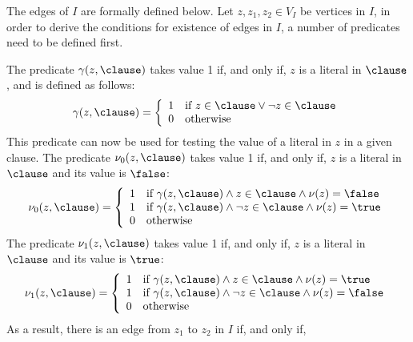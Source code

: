 The edges of $I$ are formally defined below. Let $z, z_1, z_2 \in V_I$ be
vertices in $I$, in order to derive the conditions for existence of edges in
$I$, a number of predicates need to be defined first. 

\begin{definition}
    The predicate $\gamma(z, \clause)$ takes value 1 if, and only if, $z$
    is a literal in $\clause$, and is defined as follows:
    \begin{equation}
        \gamma(z, \clause) = 
        \left\{
            \begin{array}{ll}
                1 & \text{if $z \in \clause \lor \neg z \in \clause$} \\
                0 & \text{otherwise}
            \end{array}
        \right.
    \end{equation}
    This predicate can now be used for testing the value of a literal in $z$ in
    a given clause. The predicate $\nu_0(z, \clause)$ takes value 1 if, and only
    if, $z$ is a literal in $\clause$ and its value is $\false$:
    \begin{equation}
        \nu_0(z, \clause) = 
        \left\{
            \begin{array}{ll}
                1 & \text{if $\gamma(z, \clause) \land z \in \clause \land \nu(z) = \false$}\\
                1 & \text{if $\gamma(z, \clause) \land \neg z \in \clause \land
                \nu(z) = \true$}\\
                0 & \text{otherwise}
            \end{array}
        \right.
    \end{equation}
    The predicate $\nu_1(z, \clause)$ takes value 1 if, and only if, $z$ is a
    literal in $\clause$ and its value is $\true$:
    \begin{equation}
        \nu_1(z, \clause) = 
        \left\{
            \begin{array}{ll}
                1 & \text{if $\gamma(z, \clause) \land z \in \clause \land
                \nu(z) = \true$}\\
                1 & \text{if $\gamma(z, \clause) \land \neg z \in \clause \land
                \nu(z) = \false$}\\
                0 & \text{otherwise}
            \end{array}
        \right.
    \end{equation}
    As a result, there is an edge from $z_1$ to $z_2$ in $I$ if, and only if,

\end{definition}
